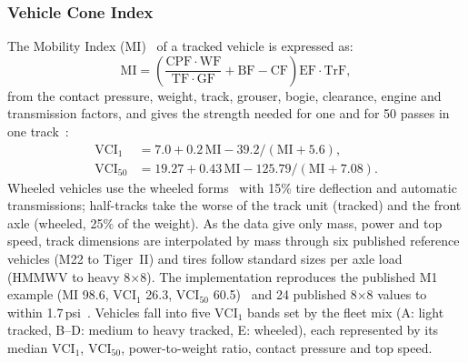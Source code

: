 \documentclass[conference]{IEEEtran}
\begin{document}
\subsubsection{Vehicle Cone Index}
The Mobility Index (MI)~\cite{rula1971,haley1979} of a tracked vehicle is expressed as:
\begin{equation}
  \mathrm{MI} = \left(\frac{\mathrm{CPF}\cdot\mathrm{WF}}{\mathrm{TF}\cdot\mathrm{GF}}
  + \mathrm{BF} - \mathrm{CF}\right)\mathrm{EF}\cdot\mathrm{TrF},
\end{equation}
from the contact pressure, weight, track, grouser, bogie, clearance, engine and transmission
factors, and gives the strength needed for one and for 50 passes in one track~\cite{ciobotaru2009}:
\begin{align}
  \mathrm{VCI}_1    &= 7.0 + 0.2\,\mathrm{MI} - 39.2/(\mathrm{MI} + 5.6), \\
  \mathrm{VCI}_{50} &= 19.27 + 0.43\,\mathrm{MI} - 125.79/(\mathrm{MI} + 7.08).
\end{align}
Wheeled vehicles use the wheeled forms~\cite{rosca2017,rosca2018} with 15\% tire deflection and
automatic transmissions; half-tracks take the worse of the track unit (tracked) and the front
axle (wheeled, 25\% of the weight). As the data give only mass, power and top speed, track
dimensions are interpolated by mass through six published reference vehicles (M22 to Tiger~II)
and tires follow standard sizes per axle load (HMMWV to heavy 8$\times$8). The implementation reproduces
the published M1 example (MI 98.6, $\mathrm{VCI}_1$ 26.3, $\mathrm{VCI}_{50}$
60.5)~\cite{ciobotaru2009} and 24 published 8$\times$8 values to within
1.7\,psi~\cite{rosca2017}. Vehicles fall into five $\mathrm{VCI}_1$ bands set by the fleet mix
(A: light tracked, B--D: medium to heavy tracked, E: wheeled), each represented by its median
$\mathrm{VCI}_1$, $\mathrm{VCI}_{50}$, power-to-weight ratio, contact pressure and top speed.
\end{document}
